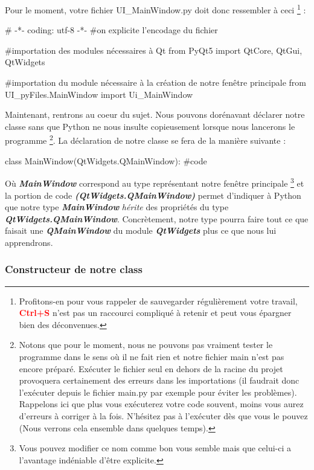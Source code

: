 \documentclass[12pt]{report}    %
\newcommand{\bold}[1]{{\bfseries #1}}
\newcommand{\italic}[1]{{\itshape #1}}
\newcommand{\ib}[1]{{\bfseries\itshape #1}}
\newcommand{\smallSkip}{\vskip 0.5cm}
\begin{document}
Pour le moment, votre fichier UI\_MainWindow.py doit donc ressembler à ceci
\footnote
{
Profitons-en pour vous rappeler de sauvegarder régulièrement votre travail, \textcolor{red}{\bold{Ctrl+S}} n'est pas un raccourci compliqué à retenir et peut vous épargner bien des déconvenues.
}
:
\begin{pyCode}
# -*- coding: utf-8 -*-
#on explicite l’encodage du fichier

#importation des modules nécessaires à Qt
from PyQt5 import QtCore, QtGui, QtWidgets

#importation du module nécessaire à la création de notre fenêtre principale
from UI_pyFiles.MainWindow import Ui_MainWindow
\end{pyCode}
\smallSkip %

Maintenant, rentrons au coeur du sujet. Nous pouvons dorénavant déclarer notre classe sans que Python ne nous insulte copieusement lorsque nous lancerons le programme
\footnote
{
Notons que pour le moment, nous ne pouvons pas vraiment tester le programme dans le sens où il ne fait rien et notre fichier main n'est pas encore préparé. Exécuter le fichier seul en dehors de la racine du projet provoquera certainement des erreurs dans les importations (il faudrait donc l'exécuter depuis le fichier main.py par exemple pour éviter les problèmes).\newline
Rappelons ici que plus vous exécuterez votre code souvent, moins vous aurez d'erreurs à corriger à la fois. N'hésitez pas à l'exécuter dès que vous le pouvez (Nous verrons cela ensemble dans quelques temps).
}.\newline
La déclaration de notre classe se fera de la manière suivante :
\begin{pyCode}
class MainWindow(QtWidgets.QMainWindow):
    #code
\end{pyCode}
Où \italic{\bold{MainWindow}} correspond au type représentant notre fenêtre principale
\footnote
{
Vous pouvez modifier ce nom comme bon vous semble mais que celui-ci a l'avantage indéniable d'être explicite.
}
et la portion de code \ib{(QtWidgets.QMainWindow)} permet d'indiquer à Python que notre type \ib{MainWindow} \italic{hérite} des propriétés du type \ib{QtWidgets.QMainWindow}.\newline
Concrètement, notre type pourra faire tout ce que faisait une \ib{QMainWindow} du module \ib{QtWidgets} plus ce que nous lui apprendrons.


\subsubsection{Constructeur de notre class}
\end{document}
